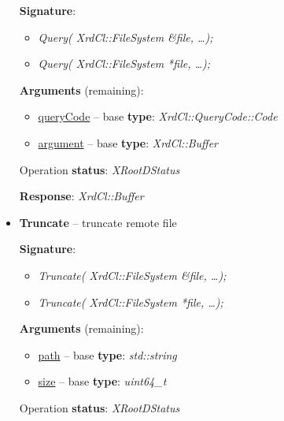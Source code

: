 \documentclass{article}
\begin{document}
\begin{itemize}
\begin{samepage}
                    \textbf{Signature}:
                    \begin{itemize}
                        \item \textit{Query( XrdCl::FileSystem \&file, \ldots);}
                        \item \textit{Query( XrdCl::FileSystem *file, \ldots );}
                    \end{itemize}

                    \textbf{Arguments} (remaining):
                    \begin{itemize}
                        \item \underline{queryCode} -- base \textbf{type}: \textit{XrdCl::QueryCode::Code}
                        \item \underline{argument} -- base \textbf{type}: \textit{XrdCl::Buffer}
                    \end{itemize}

                    Operation \textbf{status}: \textit{XRootDStatus}

                    \textbf{Response}: \textit{XrdCl::Buffer}
                    
                \end{samepage}
                    
                \item \begin{samepage} \textbf{Truncate} -- truncate remote file

                    \textbf{Signature}:
                    \begin{itemize}
                        \item \textit{Truncate( XrdCl::FileSystem \&file, \ldots);}
                        \item \textit{Truncate( XrdCl::FileSystem *file, \ldots );}
                    \end{itemize}

                    \textbf{Arguments} (remaining):
                    \begin{itemize}
                        \item \underline{path} -- base \textbf{type}: \textit{std::string}
                        \item \underline{size} -- base \textbf{type}: \textit{uint64_t}
                    \end{itemize}

                    Operation \textbf{status}: \textit{XRootDStatus}


\end{samepage}
\end{itemize}
\end{document}
